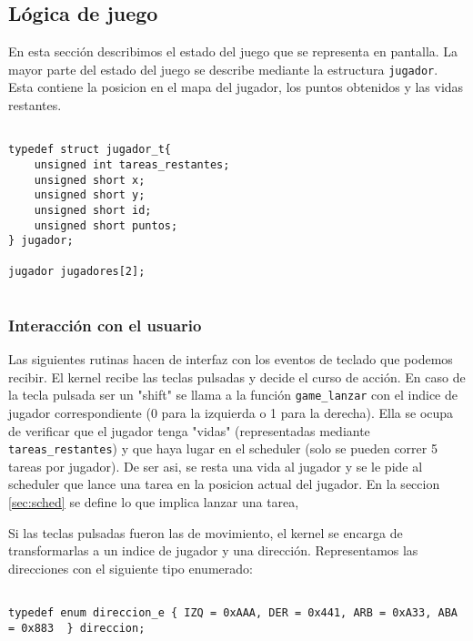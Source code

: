 
\subsection{Lógica de juego}

\label{sec:game}

En esta sección describimos el estado del juego que se representa en pantalla.
La mayor parte del estado del juego se describe mediante la estructura \verb|jugador|. Esta contiene la posicion en el mapa del jugador, los puntos obtenidos y las vidas restantes.



\begin{verbatim}

typedef struct jugador_t{
    unsigned int tareas_restantes;
    unsigned short x;
    unsigned short y;
    unsigned short id;
    unsigned short puntos;
} jugador;

jugador jugadores[2];


\end{verbatim}


\subsubsection{Interacción con el usuario}


Las siguientes rutinas hacen de interfaz con los eventos de teclado que podemos recibir. El kernel recibe las teclas pulsadas y decide el curso de acción. 
En caso de la tecla pulsada ser un "shift" se llama a la función \verb|game_lanzar| con el indice de jugador correspondiente (0 para la izquierda o 1 para la derecha). Ella se ocupa de verificar que el jugador tenga "vidas" (representadas mediante \verb|tareas_restantes|) y que haya lugar en el scheduler (solo se pueden correr 5 tareas por jugador). De ser asi, se resta una vida al jugador y se le pide al scheduler que lance una tarea en la posicion actual del jugador. En la seccion \ref{sec:sched} se define lo que implica lanzar una tarea,

Si las teclas pulsadas fueron las de movimiento, el kernel se encarga de transformarlas a un indice de jugador y una dirección. Representamos las direcciones con el siguiente tipo enumerado:

\begin{verbatim}

typedef enum direccion_e { IZQ = 0xAAA, DER = 0x441, ARB = 0xA33, ABA = 0x883  } direccion;

\end{verbatim}

